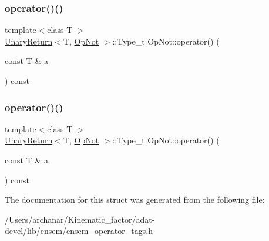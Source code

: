 \mbox{\label{structOpNot_ac76618313170c606b7fb1ca1c2b0f164}} 
\subsubsection{\texorpdfstring{operator()()}{operator()()}\hspace{0.1cm}{\footnotesize\ttfamily [2/3]}}
{\footnotesize\ttfamily template$<$class T $>$ \\
\mbox{\hyperlink{structUnaryReturn}{Unary\+Return}}$<$T, \mbox{\hyperlink{structOpNot}{Op\+Not}} $>$\+::Type\+\_\+t Op\+Not\+::operator() (\begin{DoxyParamCaption}\item[{const T \&}]{a }\end{DoxyParamCaption}) const\hspace{0.3cm}{\ttfamily [inline]}}

\mbox{\label{structOpNot_ac76618313170c606b7fb1ca1c2b0f164}} 
\subsubsection{\texorpdfstring{operator()()}{operator()()}\hspace{0.1cm}{\footnotesize\ttfamily [3/3]}}
{\footnotesize\ttfamily template$<$class T $>$ \\
\mbox{\hyperlink{structUnaryReturn}{Unary\+Return}}$<$T, \mbox{\hyperlink{structOpNot}{Op\+Not}} $>$\+::Type\+\_\+t Op\+Not\+::operator() (\begin{DoxyParamCaption}\item[{const T \&}]{a }\end{DoxyParamCaption}) const\hspace{0.3cm}{\ttfamily [inline]}}



The documentation for this struct was generated from the following file\+:\begin{DoxyCompactItemize}
\item 
/\+Users/archanar/\+Kinematic\+\_\+factor/adat-\/devel/lib/ensem/\mbox{\hyperlink{adat-devel_2lib_2ensem_2ensem__operator__tags_8h}{ensem\+\_\+operator\+\_\+tags.\+h}}\end{DoxyCompactItemize}
